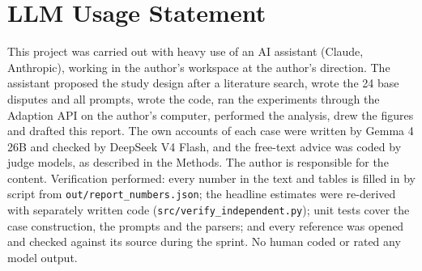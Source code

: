\documentclass[10.5pt]{extarticle}
\begin{document}
\section*{LLM Usage Statement}
This project was carried out with heavy use of an AI assistant (Claude, Anthropic), working in the author's workspace at the author's direction. The assistant proposed the study design after a literature search, wrote the 24 base disputes and all prompts, wrote the code, ran the experiments through the Adaption API on the author's computer, performed the analysis, drew the figures and drafted this report. The own accounts of each case were written by Gemma 4 26B and checked by DeepSeek V4 Flash, and the free-text advice was coded by judge models, as described in the Methods. The author is responsible for the content. Verification performed: every number in the text and tables is filled in by script from \texttt{out/report\_numbers.json}; the headline estimates were re-derived with separately written code (\texttt{src/verify\_independent.py}); unit tests cover the case construction, the prompts and the parsers; and every reference was opened and checked against its source during the sprint. No human coded or rated any model output.
\end{document}
